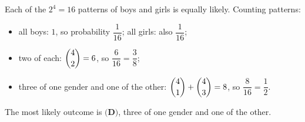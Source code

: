 Each of the $2^4=16$ patterns of boys and girls is equally likely. Counting patterns:
\begin{itemize}
\item all boys: $1$, so probability $\dfrac{1}{16}$; all girls: also $\dfrac{1}{16}$;
\item two of each: $\dbinom42=6$, so $\dfrac{6}{16}=\dfrac38$;
\item three of one gender and one of the other: $\dbinom41+\dbinom43=8$, so $\dfrac{8}{16}=\dfrac12$.
\end{itemize}
The most likely outcome is $\boxed{\textbf{(D)}}$, three of one gender and one of the other.
